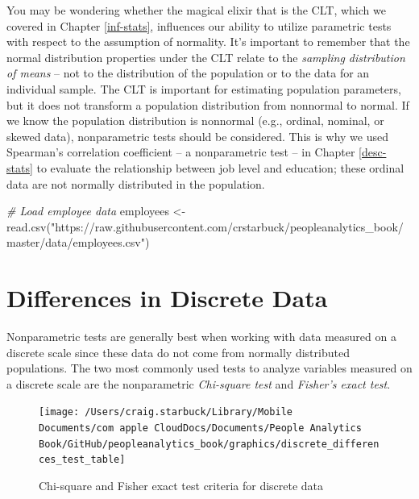 \documentclass[
]{book}
\newenvironment{Shaded}{\begin{snugshade}}{\end{snugshade}}
\newcommand{\CommentTok}[1]{\textcolor[rgb]{0.56,0.35,0.01}{\textit{#1}}}
\newcommand{\FunctionTok}[1]{\textcolor[rgb]{0.00,0.00,0.00}{#1}}
\newcommand{\NormalTok}[1]{#1}
\newcommand{\OtherTok}[1]{\textcolor[rgb]{0.56,0.35,0.01}{#1}}
\newcommand{\StringTok}[1]{\textcolor[rgb]{0.31,0.60,0.02}{#1}}
\begin{document}
You may be wondering whether the magical elixir that is the CLT, which we covered in Chapter \ref{inf-stats}, influences our ability to utilize parametric tests with respect to the assumption of normality. It's important to remember that the normal distribution properties under the CLT relate to the \emph{sampling distribution of means} -- not to the distribution of the population or to the data for an individual sample. The CLT is important for estimating population parameters, but it does not transform a population distribution from nonnormal to normal. If we know the population distribution is nonnormal (e.g., ordinal, nominal, or skewed data), nonparametric tests should be considered. This is why we used Spearman's correlation coefficient -- a nonparametric test -- in Chapter \ref{desc-stats} to evaluate the relationship between job level and education; these ordinal data are not normally distributed in the population.

\begin{Shaded}
\begin{Highlighting}[]
\CommentTok{\# Load employee data}
\NormalTok{employees }\OtherTok{\textless{}{-}} \FunctionTok{read.csv}\NormalTok{(}\StringTok{"https://raw.githubusercontent.com/crstarbuck/peopleanalytics\_book/master/data/employees.csv"}\NormalTok{)}
\end{Highlighting}
\end{Shaded}

\hypertarget{differences-in-discrete-data}{%
\section{Differences in Discrete Data}\label{differences-in-discrete-data}}

Nonparametric tests are generally best when working with data measured on a discrete scale since these data do not come from normally distributed populations. The two most commonly used tests to analyze variables measured on a discrete scale are the nonparametric \emph{Chi-square test} and \emph{Fisher's exact test}.

\begin{figure}

{\centering \texttt{[image: /Users/craig.starbuck/Library/Mobile Documents/com~apple~CloudDocs/Documents/People Analytics Book/GitHub/peopleanalytics\_book/graphics/discrete\_differences\_test\_table]} 

}

\caption{Chi-square and Fisher exact test criteria for discrete data}\label{fig:discrete-tests}
\end{figure}
\end{document}
